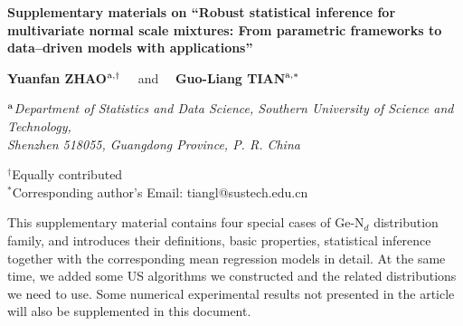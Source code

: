 \begin{flushleft}
{\Large \bf Supplementary materials on ``Robust statistical inference for multivariate normal scale mixtures: From parametric frameworks to data--driven models with applications''}
\end{flushleft}

\smallskip
\begin{flushleft}
{\bf Yuanfan ZHAO$^{{\rm a}, \dag}$}   \ \  and \ \
{\bf Guo-Liang TIAN$^{{\rm a}, *}$}  \ \

\vkL
{\small \it $^{\rm a}$Department of Statistics and Data Science,
                      Southern University of Science and Technology, \\ Shenzhen 518055, Guangdong Province, P. R. China}

\vkL
{\small  $^{\dag}$Equally contributed} \\
{\small  $^*$Corresponding author's Email: \textsf{tiangl@sustech.edu.cn}} \\
\end{flushleft}

\baselineskip 0.30in
\setcounter{equation}{0}

This supplementary material contains four special cases of Ge-N$_d$ distribution family, and introduces their definitions, basic properties, statistical inference together with the corresponding mean regression models in detail. At the same time, we added some US algorithms we constructed and the related distributions we need to use. Some numerical experimental results not presented in the article will also be supplemented in this document.